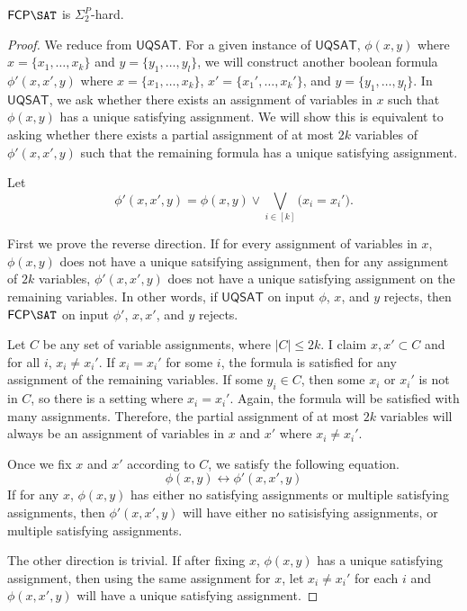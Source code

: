 \documentclass[runningheads,a4paper]{llncs}
\newcommand{\UQSAT}{\mathsf{UQSAT}}
\begin{document}
\begin{proposition}
\label{prop:fcpsatsigmacomp}
$\mathsf{FCP} \SAT$ is $\Sigma_2^P$-hard.
\end{proposition}

\begin{proof}
We reduce from $\UQSAT$. For a given instance of $\UQSAT$, $\phi(x, y)$ where $x = \{ x_1, \dots, x_k\}$ and $y = \{ y_1, \dots, y_l\}$, we will construct another boolean formula $\phi'(x, x', y)$ where $x = \{ x_1, \dots, x_k\}$, $x' = \{ x_1', \dots, x_k'\}$, and $y = \{ y_1, \dots, y_l\}$. In $\UQSAT$, we ask whether there exists an assignment of variables in $x$ such that $\phi(x, y)$ has a unique satisfying assignment. We will show this is equivalent to asking whether there exists a partial assignment of at most $2k$ variables of $\phi'(x, x', y)$ such that the remaining formula has a unique satisfying assignment.

Let
\begin{equation}
\phi'(x, x', y) = \phi(x,y) \vee \bigvee_{i \in [k]} \big( x_i = x_i' \big).
\end{equation}

First we prove the reverse direction. If for every assignment of variables in $x$, $\phi(x,y)$ does not have a unique satsifying assignment, then for any assignment of $2k$ variables, $\phi'(x,x',y)$ does not have a unique satisfying assignment on the remaining variables. In other words, if $\UQSAT$ on input $\phi$, $x$, and $y$ rejects, then $\mathsf{FCP} \SAT$ on input $\phi'$, $x, x'$, and $y$ rejects. 
 
Let $C$ be any set of variable assignments, where $|C| \leq 2k$. I claim $x, x' \subset C$ and for all $i$, $x_i \neq x_i'$. If $x_i = x_i'$ for some $i$, the formula is satisfied for any assignment of the remaining variables. If some $y_i \in C$, then some $x_i$ or $x_i'$ is not in $C$, so there is a setting where $x_i = x_i'$. Again, the formula will be satisfied with many assignments. Therefore, the partial assignment of at most $2k$ variables will always be an assignment of variables in $x$ and $x'$ where $x_i \neq x_i'$. 

Once we fix $x$ and $x'$ according to $C$, we satisfy the following equation. 
\begin{equation}
\label{eq:phiandphisame}
 \phi(x, y) \leftrightarrow \phi'(x,x',y) 
\end{equation}
If for any $x$, $\phi(x,y)$ has either no satisfying assignments or multiple satisfying assignments, then $\phi'(x,x',y)$ will have either no satisisfying assignments, or multiple satisfying assignments. 

The other direction is trivial. If after fixing $x$, $\phi(x,y)$ has a unique satisfying assignment, then using the same assignment for $x$, let $x_i \neq x_i'$ for each $i$ and $\phi(x,x',y)$ will have a unique satisfying assignment.

\end{proof}
\end{document}
